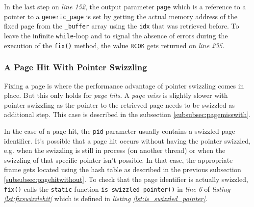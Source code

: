 	In the last step on \emph{line 152}, the output parameter \lstinline{page} which is a reference to a pointer to a \lstinline{generic_page} is set by getting the actual memory address of the fixed page from the \lstinline{_buffer} array using the \lstinline{idx} that was retrieved before. To leave the infinite \lstinline{while}-loop and to signal the absence of errors during the execution of the \lstinline{fix()} method, the value \lstinline{RCOK} gets returned on \emph{line 235}.

\subsubsection{A Page Hit With Pointer Swizzling} \label{subsubsec:pagehitwith}

	Fixing a page is where the performance advantage of pointer swizzling comes in place. But this only holds for \emph{page hits}. A \emph{page miss} is slightly slower with pointer swizzling as the pointer to the retrieved page needs to be swizzled as additional step. This case is described in the subsection \ref{subsubsec:pagemisswith}.

\begin{@empty}
	\lstset{
		language = [ISO]C++,
		style = basic
	}
	\begin{code}[ht!]
		\caption{Implementation of \lstinline{bf_tree_m::fix()} in case of a page hit with having a swizzled page identifier} \label{lst:fixswizzlehit}
		
	\end{code}
\end{@empty}	

	 In the case of a page hit, the \lstinline{pid} parameter usually contains a swizzled page identifier. It's possible that a page hit occurs without having the pointer swizzled, e.g. when the swizzling is still in process (on another thread) or when the swizzling of that specific pointer isn't possible. In that case, the appropriate frame gets located using the hash table as described in the previous subsection \ref{subsubsec:pagehitwithout}. To check that the page identifier is actually swizzled, \lstinline{fix()} calls the \lstinline{static} function \lstinline{is_swizzled_pointer()} in \emph{line 6} of \emph{listing \ref{lst:fixswizzlehit}} which is defined in \emph{listing \ref{lst:is_swizzled_pointer}}.

\begin{@empty}
	\lstset{
		language = [ISO]C++,
		style = basic
	}
	\begin{code}[ht!]
		\caption{Implementation of \lstinline{bf_tree_m::is_swizzled_pointer()}} \label{lst:is_swizzled_pointer}
		
	\end{code}
\end{@empty}	
	
